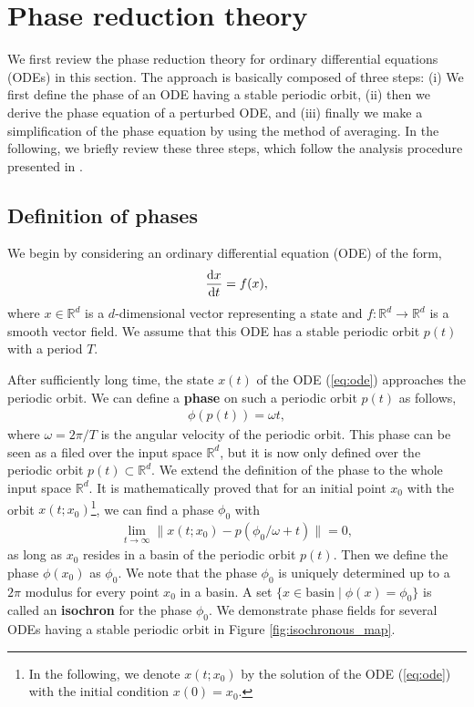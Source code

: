 \section{Phase reduction theory}

We first review the phase reduction theory for ordinary differential equations (ODEs) in this section.
The approach is basically composed of three steps:
(i) We first define the phase of an ODE having a stable periodic orbit,
(ii) then we derive the phase equation of a perturbed ODE,
and (iii) finally we make a simplification of the phase equation by using the method of averaging.
In the following, we briefly review these three steps, which follow the analysis procedure presented in \cite{kori2011}.

\subsection{Definition of phases}
We begin by considering an ordinary differential equation (ODE) of the form,
\begin{align}
  \frac{\mathrm{d} x}{\mathrm{d} t}=f(x),
  \label{eq:ode}
\end{align}
where $x\in\mathbb{R}^{d}$ is a $d$-dimensional vector representing a state and $f\colon\mathbb{R}^{d}\to\mathbb{R}^{d}$ is a smooth vector field.
We assume that this ODE has a stable periodic orbit $p(t)$ with a period $T$.

After sufficiently long time, the state $x(t)$ of the ODE (\ref{eq:ode}) approaches the periodic orbit.
We can define a \textbf{phase} on such a periodic orbit $p(t)$ as follows,
\begin{align}
  \phi(p(t))=\omega t,
\end{align}
where $\omega=2\pi/T$ is the angular velocity of the periodic orbit.
This phase can be seen as a filed over the input space $\mathbb{R}^{d}$,
but it is now only defined over the periodic orbit $p(t) \subset \mathbb{R}^{d}$.
We extend the definition of the phase to the whole input space $\mathbb{R}^{d}$.
It is mathematically proved that for an initial point $x_{0}$ with the orbit $x(t; x_{0})$\footnote{In the following, we denote $x(t;x_{0})$ by the solution of the ODE (\ref{eq:ode}) with the initial condition $x(0)=x_{0}$.},
we can find a phase $\phi_{0}$ with
\begin{align}
  \lim_{t\to\infty}\|x(t;x_{0})-p(\phi_{0}/\omega+t)\|=0,
  \label{eq:phase}
\end{align}
as long as $x_{0}$ resides in a basin of the periodic orbit $p(t)$.
Then we define the phase $\phi(x_{0})$ as $\phi_{0}$.
We note that the phase $\phi_{0}$ is uniquely determined up to a $2\pi$ modulus for every point $x_{0}$ in a basin.
A set $\{x\in\mathrm{basin} \mid \phi(x)=\phi_{0}\}$ is called an \textbf{isochron} for the phase $\phi_{0}$.
We demonstrate phase fields for several ODEs having a stable periodic orbit in Figure \ref{fig:isochronous_map}.

